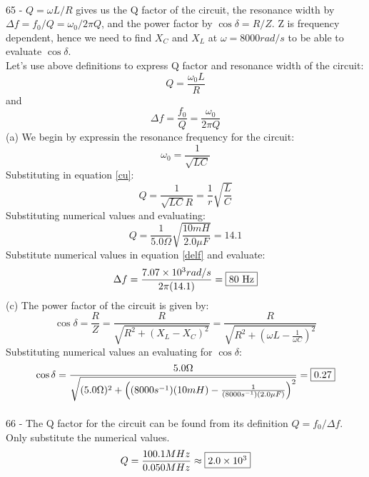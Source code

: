 \documentclass{report}
\begin{document}
\paragraph{}
65 - $Q = \omega L / R$ gives us the Q factor of the circuit, the resonance width by $\Delta f = f_0 / Q = \omega_0 / 2 \pi Q$, and the power factor by $\cos \delta = R / Z$. Z is frequency dependent, hence we need to find $X_C$ and $X_L$ at $\omega = 8000 rad / s$ to be able to evaluate $\cos \delta$.\\
Let's use above definitions to express Q factor and resonance width of the circuit:
\begin{equation}\label{cu}
  Q = \frac{\omega_0 L}{R}
\end{equation}
and
\begin{equation}\label{delf}
 \Delta f = \frac{f_0}{Q} = \frac{\omega_0}{2 \pi Q}
\end{equation}
(a) We begin by expressin the resonance frequency for the circuit:
$$\omega_0 = \frac{1}{\sqrt{LC}}$$
Substituting in equation \ref{cu}:
$$Q = \frac{1}{\sqrt{LC} R} = \frac{1}{r}\sqrt{\frac{L}{C}}$$
Substituting numerical values and evaluating:
$$Q = \frac{1}{5.0 \Omega} \sqrt{\frac{10 mH}{2.0 \mu F}} = 14.1$$
Substitute numerical values in equation \ref{delf} and evaluate:
$$\Delta f = \frac{7.07 \times 10^3 rad / s}{2 \pi (14.1)} = \fbox{80 Hz}$$
(c) The power factor of the circuit is given by:
$$\cos \delta = \frac{R}{Z} = \frac{R}{\sqrt{R^2 + (X_L - X_C)^2}} = \frac{R}{\sqrt{R^2 + \left( \omega L - \frac{1}{\omega C}\right)^2}}$$
Substituting numerical values an evaluating for $\cos \delta$:
$$\cos \delta = \frac{5.0 \Omega}{\sqrt{(5.0 \Omega)^2 + \left( (8000s^{-1})(10 mH) - \frac{1}{(8000s^{-1})(2.0 \mu F)} \right)^2}} = \fbox{0.27}$$

\paragraph{}
66 - The Q factor for the circuit can be found from its definition $Q = f_0 / \Delta f$. Only substitute the numerical values.
$$Q = \frac{100.1 MHz}{0.050 MHz} \approx \fbox{$2.0 \times 10^3$}$$
\end{document}
